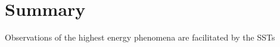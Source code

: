 \chapter{\label{ch9-summary}Summary} 

\minitoc


Observations of the highest energy phenomena are facilitated by the SSTs